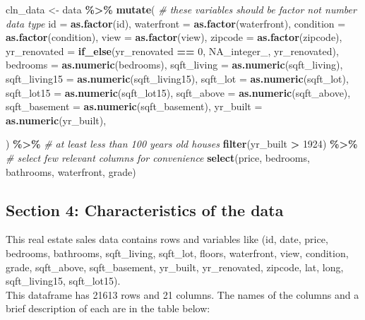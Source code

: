 \documentclass[
]{article}
\newenvironment{Shaded}{\begin{snugshade}}{\end{snugshade}}
\newcommand{\AttributeTok}[1]{\textcolor[rgb]{0.13,0.29,0.53}{#1}}
\newcommand{\CommentTok}[1]{\textcolor[rgb]{0.56,0.35,0.01}{\textit{#1}}}
\newcommand{\ConstantTok}[1]{\textcolor[rgb]{0.56,0.35,0.01}{#1}}
\newcommand{\DecValTok}[1]{\textcolor[rgb]{0.00,0.00,0.81}{#1}}
\newcommand{\FunctionTok}[1]{\textcolor[rgb]{0.13,0.29,0.53}{\textbf{#1}}}
\newcommand{\NormalTok}[1]{#1}
\newcommand{\OtherTok}[1]{\textcolor[rgb]{0.56,0.35,0.01}{#1}}
\newcommand{\SpecialCharTok}[1]{\textcolor[rgb]{0.81,0.36,0.00}{\textbf{#1}}}
\begin{document}
\begin{Shaded}
\begin{Highlighting}[]
\NormalTok{cln\_data }\OtherTok{\textless{}{-}}\NormalTok{ data }\SpecialCharTok{\%\textgreater{}\%} 
  \FunctionTok{mutate}\NormalTok{(}
  \CommentTok{\# these variables should be factor not number data type}
  \AttributeTok{id =} \FunctionTok{as.factor}\NormalTok{(id),}
  \AttributeTok{waterfront =} \FunctionTok{as.factor}\NormalTok{(waterfront),}
  \AttributeTok{condition =} \FunctionTok{as.factor}\NormalTok{(condition), }
  \AttributeTok{view =} \FunctionTok{as.factor}\NormalTok{(view),}
  \AttributeTok{zipcode =} \FunctionTok{as.factor}\NormalTok{(zipcode),}
  \AttributeTok{yr\_renovated =} \FunctionTok{if\_else}\NormalTok{(yr\_renovated }\SpecialCharTok{==} \DecValTok{0}\NormalTok{, }\ConstantTok{NA\_integer\_}\NormalTok{, yr\_renovated),}
  \AttributeTok{bedrooms =} \FunctionTok{as.numeric}\NormalTok{(bedrooms),}
  \AttributeTok{sqft\_living =} \FunctionTok{as.numeric}\NormalTok{(sqft\_living),}
  \AttributeTok{sqft\_living15 =} \FunctionTok{as.numeric}\NormalTok{(sqft\_living15),}
  \AttributeTok{sqft\_lot =} \FunctionTok{as.numeric}\NormalTok{(sqft\_lot),}
  \AttributeTok{sqft\_lot15 =} \FunctionTok{as.numeric}\NormalTok{(sqft\_lot15),}
  \AttributeTok{sqft\_above =} \FunctionTok{as.numeric}\NormalTok{(sqft\_above),}
  \AttributeTok{sqft\_basement =} \FunctionTok{as.numeric}\NormalTok{(sqft\_basement),}
  \AttributeTok{yr\_built =} \FunctionTok{as.numeric}\NormalTok{(yr\_built),}

\NormalTok{  ) }\SpecialCharTok{\%\textgreater{}\%}
  \CommentTok{\# at least less than 100 years old houses}
  \FunctionTok{filter}\NormalTok{(yr\_built }\SpecialCharTok{\textgreater{}} \DecValTok{1924}\NormalTok{) }\SpecialCharTok{\%\textgreater{}\%}
  \CommentTok{\# select few relevant columns for convenience}
  \FunctionTok{select}\NormalTok{(price, bedrooms, bathrooms, waterfront, grade)}
\end{Highlighting}
\end{Shaded}

\hypertarget{section-4-characteristics-of-the-data}{%
\subsection{Section 4: Characteristics of the
data}\label{section-4-characteristics-of-the-data}}

This real estate sales data contains rows and variables like (id, date,
price, bedrooms, bathrooms, sqft\_living, sqft\_lot, floors, waterfront,
view, condition, grade, sqft\_above, sqft\_basement, yr\_built,
yr\_renovated, zipcode, lat, long, sqft\_living15, sqft\_lot15).\\
This dataframe has 21613 rows and 21 columns. The names of the columns
and a brief description of each are in the table below:
\end{document}
